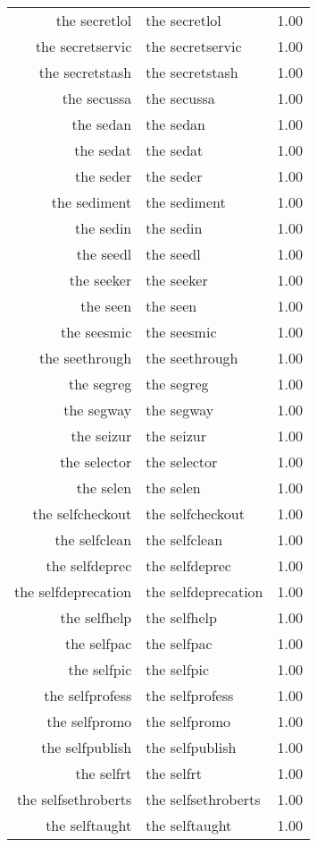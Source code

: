 \begin{table}[ht]
\begin{tabular}{rlr}
  the secretlol & the secretlol & 1.00 \\ 
  the secretservic & the secretservic & 1.00 \\ 
  the secretstash & the secretstash & 1.00 \\ 
  the secussa & the secussa & 1.00 \\ 
  the sedan & the sedan & 1.00 \\ 
  the sedat & the sedat & 1.00 \\ 
  the seder & the seder & 1.00 \\ 
  the sediment & the sediment & 1.00 \\ 
  the sedin & the sedin & 1.00 \\ 
  the seedl & the seedl & 1.00 \\ 
  the seeker & the seeker & 1.00 \\ 
  the seen & the seen & 1.00 \\ 
  the seesmic & the seesmic & 1.00 \\ 
  the seethrough & the seethrough & 1.00 \\ 
  the segreg & the segreg & 1.00 \\ 
  the segway & the segway & 1.00 \\ 
  the seizur & the seizur & 1.00 \\ 
  the selector & the selector & 1.00 \\ 
  the selen & the selen & 1.00 \\ 
  the selfcheckout & the selfcheckout & 1.00 \\ 
  the selfclean & the selfclean & 1.00 \\ 
  the selfdeprec & the selfdeprec & 1.00 \\ 
  the selfdeprecation & the selfdeprecation & 1.00 \\ 
  the selfhelp & the selfhelp & 1.00 \\ 
  the selfpac & the selfpac & 1.00 \\ 
  the selfpic & the selfpic & 1.00 \\ 
  the selfprofess & the selfprofess & 1.00 \\ 
  the selfpromo & the selfpromo & 1.00 \\ 
  the selfpublish & the selfpublish & 1.00 \\ 
  the selfrt & the selfrt & 1.00 \\ 
  the selfsethroberts & the selfsethroberts & 1.00 \\ 
  the selftaught & the selftaught & 1.00 \\ 

\end{tabular}
\end{table}
